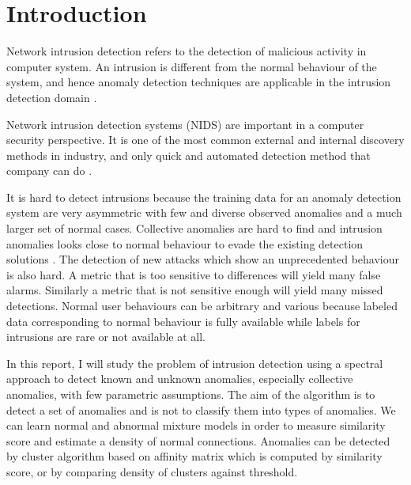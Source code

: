 \section{Introduction}
Network intrusion detection refers to the detection of malicious activity in computer system. 
An intrusion is different from the normal behaviour of the system, and hence anomaly detection techniques are applicable in the intrusion detection domain \cite{chandola09}.

Network intrusion detection systems (NIDS) are important in a computer security perspective. 
It is one of the most common external and internal discovery methods in industry, and only quick and automated detection method that company can do \cite{verizon14}. 

It is hard to detect intrusions because the training data for an anomaly detection system are very asymmetric with few and diverse observed anomalies and a much larger set of normal cases. 
Collective anomalies are hard to find and intrusion anomalies looks close to normal behaviour to evade the existing detection solutions \cite{chandola09}. 
The detection of new attacks which show an unprecedented behaviour is also hard. 
A metric that is too sensitive to differences will yield many false alarms. 
Similarly a metric that is not sensitive enough will yield many missed detections. 
Normal user behaviours can be arbitrary and various because labeled data corresponding to normal behaviour is fully available while labels for intrusions are rare or not available at all. 

In this report, I will study the problem of intrusion detection using a spectral approach to detect known and unknown anomalies, especially collective anomalies, with few parametric assumptions. 
The aim of the algorithm is to detect a set of anomalies and is not to classify them into types of anomalies. 
We can learn normal and abnormal mixture models in order to measure similarity score and estimate a density of normal connections. 
Anomalies can be detected by cluster algorithm based on affinity matrix which is computed by similarity score, or by comparing density of clusters against threshold. 
